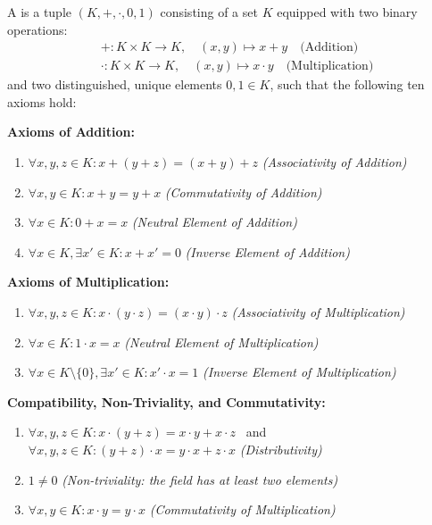 \begin{definition}[Field]
\label{def:field}
A  is a tuple $(K, +, \cdot, 0, 1)$ consisting of a set $K$ equipped with two binary operations:
\begin{align*}
&+: K \times K \rightarrow K, \quad (x, y) \mapsto x + y \quad \text{(Addition)} \\
&\cdot: K \times K \rightarrow K, \quad (x, y) \mapsto x \cdot y \quad \text{(Multiplication)}
\end{align*}
and two distinguished, unique elements $0, 1 \in K$, such that the following ten axioms hold:

\noindent
\textbf{Axioms of Addition:}
\begin{enumerate}[label=(K\arabic*), leftmargin=3.5em]
    \item $\forall x, y, z \in K: x + (y + z) = (x + y) + z$ \hfill \textit{(Associativity of Addition)}
    \item $\forall x, y \in K: x + y = y + x$ \hfill \textit{(Commutativity of Addition)}
    \item $\forall x \in K: 0 + x = x$ \hfill \textit{(Neutral Element of Addition)}
    \item $\forall x \in K, \exists x' \in K: x + x' = 0$ \hfill \textit{(Inverse Element of Addition)}
\end{enumerate}

\noindent
\textbf{Axioms of Multiplication:}
\begin{enumerate}[label=(K\arabic*), start=5, leftmargin=3.5em]
    \item $\forall x, y, z \in K: x \cdot (y \cdot z) = (x \cdot y) \cdot z$ \hfill \textit{(Associativity of Multiplication)}
    \item $\forall x \in K: 1 \cdot x = x$ \hfill \textit{(Neutral Element of Multiplication)}
    \item $\forall x \in K \setminus \{0\}, \exists x' \in K: x' \cdot x = 1$ \hfill \textit{(Inverse Element of Multiplication)}
\end{enumerate}

\noindent
\textbf{Compatibility, Non-Triviality, and Commutativity:}
\begin{enumerate}[label=(K\arabic*), start=8, leftmargin=3.5em]
    \item $\forall x, y, z \in K: x \cdot (y + z) = x \cdot y + x \cdot z$ \ and \\
          $\forall x, y, z \in K: (y + z) \cdot x = y \cdot x + z \cdot x$ \hfill \textit{(Distributivity)}
    \item $1 \ne 0$ \hfill \textit{(Non-triviality: the field has at least two elements)}
    \item $\forall x, y \in K: x \cdot y = y \cdot x$ \hfill \textit{(Commutativity of Multiplication)}
\end{enumerate}
\end{definition}

